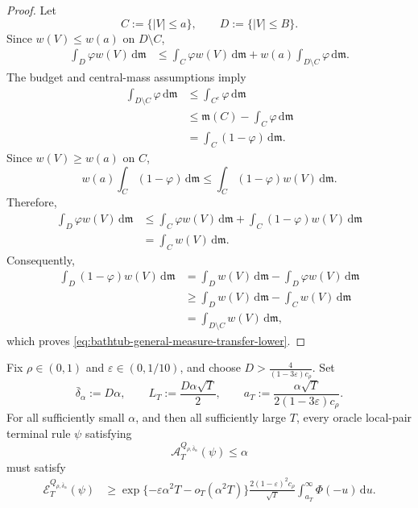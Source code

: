 \documentclass[10pt]{article}
\newcommand{\dd}{\mathrm{d}}
\theoremstyle{plain}
\begin{document}
\begin{proof}
Let
\[
    C:=\{|V|\le a\},
    \qquad
    D:=\{|V|\le B\}.
\]
Since $w(V)\le w(a)$ on $D\setminus C$,
\[
\begin{aligned}
    \int_D\varphi w(V)\,\dd\mathfrak m
    &\le
    \int_C\varphi w(V)\,\dd\mathfrak m
    +
    w(a)
    \int_{D\setminus C}\varphi\,\dd\mathfrak m.
\end{aligned}
\]
The budget and central-mass assumptions imply
\[
\begin{aligned}
    \int_{D\setminus C}\varphi\,\dd\mathfrak m
    &\le
    \int_{C^c}\varphi\,\dd\mathfrak m\\
    &\le
    \mathfrak m(C)
    -
    \int_C\varphi\,\dd\mathfrak m\\
    &=
    \int_C(1-\varphi)\,\dd\mathfrak m.
\end{aligned}
\]
Since $w(V)\ge w(a)$ on $C$,
\[
    w(a)
    \int_C(1-\varphi)\,\dd\mathfrak m
    \le
    \int_C
        (1-\varphi)w(V)
    \,\dd\mathfrak m.
\]
Therefore,
\[
\begin{aligned}
    \int_D\varphi w(V)\,\dd\mathfrak m
    &\le
    \int_C\varphi w(V)\,\dd\mathfrak m
    +
    \int_C(1-\varphi)w(V)\,\dd\mathfrak m\\
    &=
    \int_Cw(V)\,\dd\mathfrak m.
\end{aligned}
\]
Consequently,
\[
\begin{aligned}
    \int_D(1-\varphi)w(V)\,\dd\mathfrak m
    &=
    \int_Dw(V)\,\dd\mathfrak m
    -
    \int_D\varphi w(V)\,\dd\mathfrak m\\
    &\ge
    \int_Dw(V)\,\dd\mathfrak m
    -
    \int_Cw(V)\,\dd\mathfrak m\\
    &=
    \int_{D\setminus C}
        w(V)
    \,\dd\mathfrak m,
\end{aligned}
\]
which proves
\eqref{eq:bathtub-general-measure-transfer-lower}. 
\end{proof}

\begin{lemma}
\label{lem:flat-local-sign-transfer-lower}
Fix $\rho\in(0,1)$ and $\varepsilon\in(0,1/10)$, and choose
    $D>
    \frac{4}{(1-3\varepsilon)c_\rho}$.
Set
\[
    \bar\delta_\alpha:=D\alpha,
    \qquad
    L_T:=\frac{D\alpha\sqrt T}{2},
    \qquad
    a_T
    :=
    \frac{\alpha\sqrt T}
         {2(1-3\varepsilon)c_\rho}.
\]
For all sufficiently small $\alpha$, and then all sufficiently large $T$,
every oracle local-pair terminal rule $\psi$ satisfying
\[
    \mathcal A_T^{Q_{\rho,\bar\delta_\alpha}}(\psi)
    \le
    \alpha
\]
must satisfy
\begin{equation}
\label{eq:flat-sign-bound-transfer-lower}
\begin{aligned}
    \mathcal E_T^{Q_{\rho,\bar\delta_\alpha}}(\psi)
    &\ge
    \exp\{
        -\varepsilon\alpha^2T
        -o_T(\alpha^2T)
    \}
    \frac{
        2(1-\varepsilon)^2c_\rho
    }{
        \sqrt T
    }
    \int_{a_T}^{\infty}
        \Phi(-u)
    \,\dd u.
\end{aligned}
\end{equation}
\end{lemma}
\end{document}
